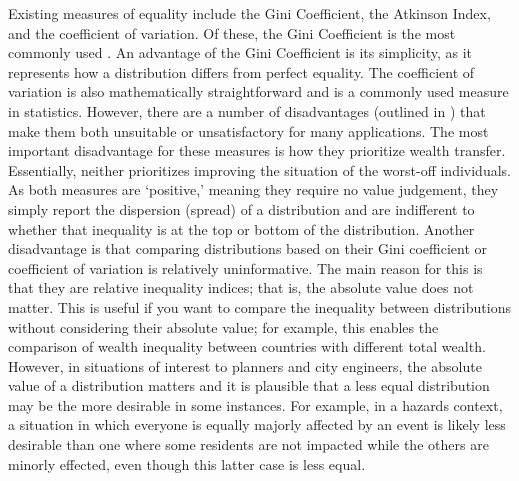\documentclass[final,3p,times,onecolumn,sort&compress]{elsarticle}
\begin{document}
Existing measures of equality include the Gini Coefficient, the Atkinson Index, and the coefficient of variation.
Of these, the Gini Coefficient is the most commonly used \citep{Whitehead2019-tf, Maguire2011-fi}.
An advantage of the Gini Coefficient is its simplicity, as it represents how a distribution differs from perfect equality.
The coefficient of variation is also mathematically straightforward and is a commonly used measure in statistics.
However, there are a number of disadvantages (outlined in \cite{Maguire2011-fi, Atkinson1970-mr, Adger1997-tu}) that make them both unsuitable or unsatisfactory for many applications.
The most important disadvantage for these measures is how they prioritize wealth transfer.
Essentially, neither prioritizes improving the situation of the worst-off individuals.
As both measures are `positive,' meaning they require no value judgement, they simply report the dispersion (spread) of a distribution and are indifferent to whether that inequality is at the top or bottom of the distribution.
Another disadvantage is that comparing distributions based on their Gini coefficient or coefficient of variation is relatively uninformative.
The main reason for this is that they are relative inequality indices; that is, the absolute value does not matter.
This is useful if you want to compare the inequality between distributions without considering their absolute value; 
for example, this enables the comparison of wealth inequality between countries with different total wealth.
However, in situations of interest to planners and city engineers, the absolute value of a distribution matters and it is plausible that a less equal distribution may be the more desirable in some instances.
For example, in a hazards context, a situation in which everyone is equally majorly affected by an event is likely less desirable than one where some residents are not impacted while the others are minorly effected, even though this latter case is less equal.
\end{document}
